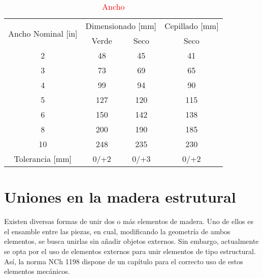 \begin{table}[H]
\centering
\caption{\textcolor{red}{Ancho}}
\label{anchodim}
\begin{tabular}{@{}cccc@{}}
\toprule
\multirow{2}{*}{Ancho Nominal {[}in{]}} & \multicolumn{2}{c}{Dimensionado {[}mm{]}} & Cepillado {[}mm{]} \\ \cmidrule(l){2-4} 
                                        & Verde                & Seco               & Seco               \\ \midrule
2                                       & 48                   & 45                 & 41                 \\
3                                       & 73                   & 69                 & 65                 \\
4                                       & 99                   & 94                 & 90                 \\
5                                       & 127                  & 120                & 115                \\
6                                       & 150                  & 142                & 138                \\
8                                       & 200                  & 190                & 185                \\
10                                      & 248                  & 235                & 230                \\ \midrule
Tolerancia {[}mm{]}                     & 0/+2                 & 0/+3               & 0/+2               \\ \bottomrule
\end{tabular}
\end{table}

\section{Uniones en la madera estrutural}
Existen diversas formas de unir dos o más elementos de madera. Uno de ellos es el ensamble entre las piezas, en cual, modificando la geometría de ambos elementos, se busca unirlas sin añadir objetos externos. Sin embargo, actualmente se opta por el uso de elementos externos para unir elementos de tipo estructural. Así, la norma NCh 1198 dispone de un capítulo para el correcto uso de estos elementos mecánicos.
